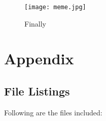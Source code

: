 \documentclass[twoside,12pt,fleqn]{book} %
\begin{document}

\begin{figure}[ht]
    \centering
    \texttt{[image: meme.jpg]}
    \caption{Finally}
    \label{fig:meme}
\end{figure}

\chapterimage{}
\chapter{Appendix}
\section{File Listings}
Following are the files included:
\end{document}
